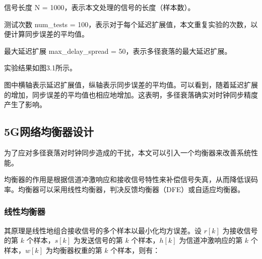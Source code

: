 \documentclass[UTF8,a4paper,12pt]{ctexart}
\numberwithin{equation}{section}
\begin{document}
信号长度 N = 1000，表示本文处理的信号的长度（样本数）。

测试次数 num\_tests = 100，表示对于每个延迟扩展值，本文重复实验的次数，以便计算同步误差的平均值。

最大延迟扩展 max\_delay\_spread = 50，表示多径衰落的最大延迟扩展。

实验结果如图3.1所示。
\begin{figure}[htb] 
\end{figure}

图中横轴表示延迟扩展值，纵轴表示同步误差的平均值。可以看到，随着延迟扩展的增加，同步误差的平均值也相应地增加。这表明，多径衰落确实对时钟同步精度产生了影响。
\subsection{5G网络均衡器设计}

为了应对多径衰落对时钟同步造成的干扰，本文可以引入一个均衡器来改善系统性能。

均衡器的作用是根据信道冲激响应和接收信号特性来补偿信号失真，从而降低误码率。均衡器可以采用线性均衡器，判决反馈均衡器（DFE）或自适应均衡器。
\subsubsection{线性均衡器}
其原理是线性地组合接收信号的多个样本以最小化均方误差。设 $r[k]$ 为接收信号的第 $k$ 个样本，$s[k]$ 为发送信号的第 $k$ 个样本，$h[k]$ 为信道冲激响应的第 $k$ 个样本，$w[k]$ 为均衡器权重的第 $k$ 个样本，则有：
\end{document}
